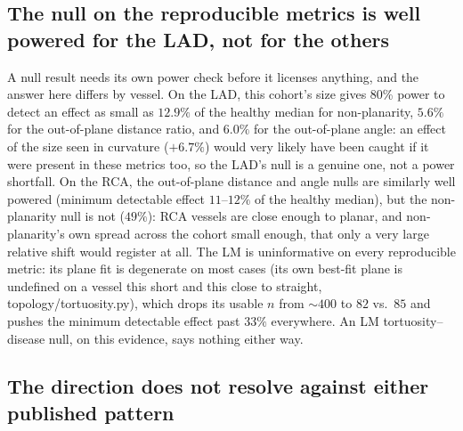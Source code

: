 \subsection*{The null on the reproducible metrics is well powered for the LAD, not for the others}

A null result needs its own power check before it licenses anything, and the answer here differs
by vessel. On the LAD, this cohort's size gives 80\% power to detect an effect as small as $12.9\%$
of the healthy median for non-planarity, $5.6\%$ for the out-of-plane distance ratio, and $6.0\%$
for the out-of-plane angle: an effect of the size seen in curvature ($+6.7\%$) would very likely
have been caught if it were present in these metrics too, so the LAD's null is a genuine one, not a
power shortfall. On the RCA, the out-of-plane distance and angle nulls are similarly well powered
(minimum detectable effect $11$--$12\%$ of the healthy median), but the non-planarity null is not
($49\%$): RCA vessels are close enough to planar, and non-planarity's own spread across the cohort
small enough, that only a very large relative shift would register at all. The LM is uninformative
on every reproducible metric: its plane fit is degenerate on most cases (its own best-fit plane is
undefined on a vessel this short and this close to straight, topology/tortuosity.py), which drops
its usable $n$ from $\sim\!400$ to $82$ vs.\ $85$ and pushes the minimum detectable effect past
$33\%$ everywhere. An LM tortuosity--disease null, on this evidence, says nothing either way.

\subsection*{The direction does not resolve against either published pattern}

